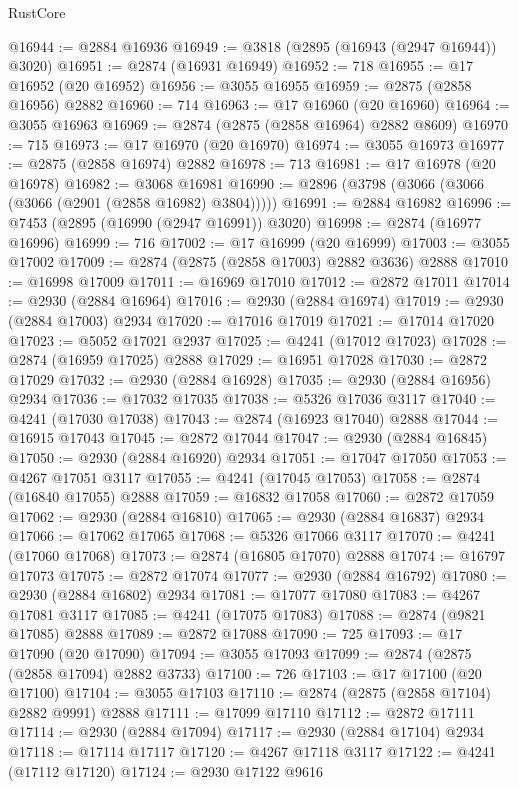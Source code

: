 \begin{lexlean}{RustCore}
\begin{coremodule}
@16944 := @2884 @16936
@16949 := @3818 (@2895 (@16943 (@2947 @16944)) @3020)
@16951 := @2874 (@16931 @16949)
@16952 := 718
@16955 := @17 @16952 (@20 @16952)
@16956 := @3055 @16955
@16959 := @2875 (@2858 @16956) @2882
@16960 := 714
@16963 := @17 @16960 (@20 @16960)
@16964 := @3055 @16963
@16969 := @2874 (@2875 (@2858 @16964) @2882 @8609)
@16970 := 715
@16973 := @17 @16970 (@20 @16970)
@16974 := @3055 @16973
@16977 := @2875 (@2858 @16974) @2882
@16978 := 713
@16981 := @17 @16978 (@20 @16978)
@16982 := @3068 @16981
@16990 := @2896 (@3798 (@3066 (@3066 (@3066 (@2901 (@2858 @16982) @3804)))))
@16991 := @2884 @16982
@16996 := @7453 (@2895 (@16990 (@2947 @16991)) @3020)
@16998 := @2874 (@16977 @16996)
@16999 := 716
@17002 := @17 @16999 (@20 @16999)
@17003 := @3055 @17002
@17009 := @2874 (@2875 (@2858 @17003) @2882 @3636) @2888
@17010 := @16998 @17009
@17011 := @16969 @17010
@17012 := @2872 @17011
@17014 := @2930 (@2884 @16964)
@17016 := @2930 (@2884 @16974)
@17019 := @2930 (@2884 @17003) @2934
@17020 := @17016 @17019
@17021 := @17014 @17020
@17023 := @5052 @17021 @2937
@17025 := @4241 (@17012 @17023)
@17028 := @2874 (@16959 @17025) @2888
@17029 := @16951 @17028
@17030 := @2872 @17029
@17032 := @2930 (@2884 @16928)
@17035 := @2930 (@2884 @16956) @2934
@17036 := @17032 @17035
@17038 := @5326 @17036 @3117
@17040 := @4241 (@17030 @17038)
@17043 := @2874 (@16923 @17040) @2888
@17044 := @16915 @17043
@17045 := @2872 @17044
@17047 := @2930 (@2884 @16845)
@17050 := @2930 (@2884 @16920) @2934
@17051 := @17047 @17050
@17053 := @4267 @17051 @3117
@17055 := @4241 (@17045 @17053)
@17058 := @2874 (@16840 @17055) @2888
@17059 := @16832 @17058
@17060 := @2872 @17059
@17062 := @2930 (@2884 @16810)
@17065 := @2930 (@2884 @16837) @2934
@17066 := @17062 @17065
@17068 := @5326 @17066 @3117
@17070 := @4241 (@17060 @17068)
@17073 := @2874 (@16805 @17070) @2888
@17074 := @16797 @17073
@17075 := @2872 @17074
@17077 := @2930 (@2884 @16792)
@17080 := @2930 (@2884 @16802) @2934
@17081 := @17077 @17080
@17083 := @4267 @17081 @3117
@17085 := @4241 (@17075 @17083)
@17088 := @2874 (@9821 @17085) @2888
@17089 := @2872 @17088
@17090 := 725
@17093 := @17 @17090 (@20 @17090)
@17094 := @3055 @17093
@17099 := @2874 (@2875 (@2858 @17094) @2882 @3733)
@17100 := 726
@17103 := @17 @17100 (@20 @17100)
@17104 := @3055 @17103
@17110 := @2874 (@2875 (@2858 @17104) @2882 @9991) @2888
@17111 := @17099 @17110
@17112 := @2872 @17111
@17114 := @2930 (@2884 @17094)
@17117 := @2930 (@2884 @17104) @2934
@17118 := @17114 @17117
@17120 := @4267 @17118 @3117
@17122 := @4241 (@17112 @17120)
@17124 := @2930 @17122 @9616

\end{coremodule}
\end{lexlean}
